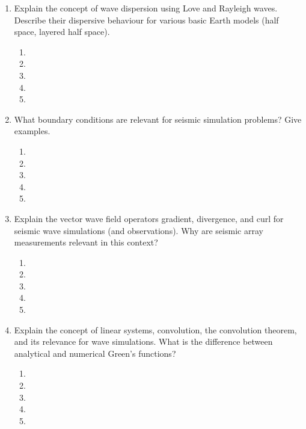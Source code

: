 \begin{enumerate}
\begin{enumerate}
\item[] 
\item[]
\item[] 
\end{enumerate}
\item
Explain the concept of wave dispersion using Love and Rayleigh waves. Describe their dispersive behaviour for various basic Earth models (half space, layered half space).  
\begin{enumerate}
\item[]
\item[]
\item[] 
\item[]
\item[] 
\end{enumerate}
\item
What boundary conditions are relevant for seismic simulation problems? Give examples. 
\begin{enumerate}
\item[]
\item[]
\item[] 
\item[]
\item[] 
\end{enumerate}
\item
Explain the vector wave field operators gradient, divergence, and curl for seismic wave simulations (and observations). Why are seismic array measurements relevant in this context?
\begin{enumerate}
\item[]
\item[]
\item[] 
\item[]
\item[] 
\end{enumerate}
\item
Explain the concept of linear systems, convolution, the convolution theorem, and its relevance for wave simulations. What is the difference between analytical and numerical Green's functions?
\begin{enumerate}
\item[]
\item[]
\item[] 
\item[]
\item[] 
\end{enumerate}
\end{enumerate}
